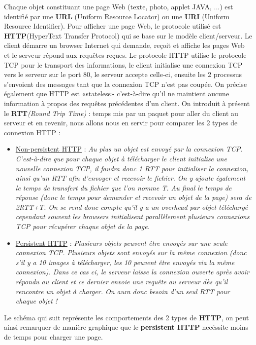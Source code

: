 \documentclass{article}
\newcommand{\ora}[1]{\textcolor{darko}{#1}}
\newcommand{\point}[2]{\item \ora{\underline{#1}} : \textit{#2}}
\begin{document}
Chaque objet constituant une page Web (texte, photo, applet JAVA, ...) est identifié par une \textbf{URL} 
(Uniform Resource Locator) ou une \textbf{URI} (Uniform Resource Identifier). Pour afficher une page Web, le 
protocole utilisé est \textbf{HTTP}(HyperText Transfer Protocol) qui se base sur le modèle client/serveur. Le 
client démarre un browser Internet qui demande, reçoit et affiche les pages Web et le serveur répond aux
requêtes reçues. Le protocole HTTP utilise le protocole TCP pour le transport des informations, le client 
initialise une connexion TCP vers le serveur sur le port 80, le serveur accepte celle-ci, ensuite les 2 
processus s'envoient des messages tant que la connexion TCP n'est pas coupée. On précise également que HTTP est
«stateless» c'est-à-dire qu'il ne maintient aucune information à propos des requêtes précédentes d'un client. On 
introduit à présent le \textbf{RTT}\textit{(Round Trip Time)} : temps mis par un paquet pour aller du client 
au serveur et en revenir, nous allons nous en servir pour comparer les 2 types de connexion HTTP :
\begin{itemize}
\point{Non-persistent HTTP}{Au plus un objet est envoyé par la connexion TCP. C'est-à-dire que pour chaque objet
à télécharger le client initialise une nouvelle connexion TCP, il faudra donc 1 RTT pour initialiser la 
connexion, ainsi qu'un RTT afin d'envoyer et recevoir le fichier. On y ajoute également le temps de transfert du
fichier que l'on nomme T. Au final le temps de réponse (donc le temps pour demander et recevoir un objet de la 
page) sera de 2RTT+T. On se rend donc compte qu'il y a un overhead par objet téléchargé cependant souvent les
browsers initialisent parallèlement plusieurs connexions TCP pour récupérer chaque objet de la page.}
\point{Persistent HTTP}{Plusieurs objets peuvent être envoyés sur une seule connexion TCP. Plusieurs objets sont
envoyés sur la même connexion (donc s'il y a 10 images à télécharger, les 10 peuvent être envoyés via la même
connexion). Dans ce cas ci, le serveur laisse la connexion ouverte après avoir répondu au client et ce dernier
envoie une requête au serveur dès qu'il rencontre un objet à charger. On aura donc besoin d'un seul RTT pour 
chaque objet !} \\
\end{itemize}

\noindent Le schéma qui suit représente les comportements des 2 types de \textbf{HTTP}, on peut ainsi remarquer 
de manière graphique que le \textbf{persistent HTTP} necéssite moins de temps pour charger une page.
\end{document}
